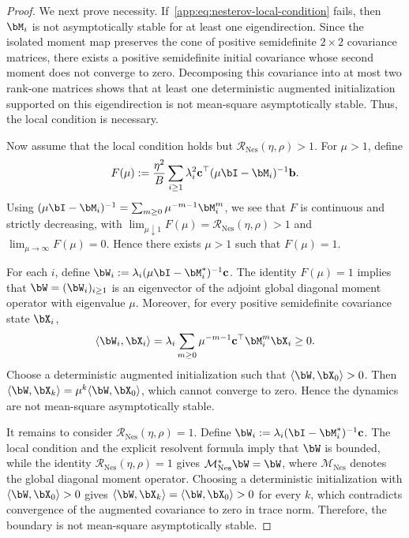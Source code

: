 \begin{proof}
We next prove necessity. If~\eqref{app:eq:nesterov-local-condition} fails, then \(\bM_i\) is not asymptotically stable for at least one eigendirection. Since the isolated moment map preserves the cone of positive semidefinite \(2\times2\) covariance matrices, there exists a positive semidefinite initial covariance whose second moment does not converge to zero. Decomposing this covariance into at most two rank-one matrices shows that at least one deterministic augmented initialization supported on this eigendirection is not mean-square asymptotically stable. Thus, the local condition is necessary.

Now assume that the local condition holds but \(\mathcal R_{\mathrm{Nes}}(\eta,\rho)>1\). For \(\mu>1\), define
\[
F(\mu):=\frac{\eta^2}{B}\sum_{i\geq1}\lambda_i^2\mathbf c^\top(\mu\bI-\bM_i)^{-1}\mathbf b.
\]
Using \((\mu\bI-\bM_i)^{-1}=\sum_{m\geq0}\mu^{-m-1}\bM_i^m\), we see that \(F\) is continuous and strictly decreasing, with \(\lim_{\mu\downarrow1}F(\mu)=\mathcal R_{\mathrm{Nes}}(\eta,\rho)>1\) and \(\lim_{\mu\to\infty}F(\mu)=0\). Hence there exists \(\mu>1\) such that \(F(\mu)=1\).

For each \(i\), define \(\bW_i:=\lambda_i(\mu\bI-\bM_i^*)^{-1}\mathbf c\). The identity \(F(\mu)=1\) implies that \(\bW=(\bW_i)_{i\geq1}\) is an eigenvector of the adjoint global diagonal moment operator with eigenvalue \(\mu\). Moreover, for every positive semidefinite covariance state \(\bX_i\),
\[
\langle\bW_i,\bX_i\rangle=\lambda_i\sum_{m\geq0}\mu^{-m-1}\mathbf c^\top\bM_i^m\bX_i\geq0.
\]
Choose a deterministic augmented initialization such that \(\langle\bW,\bX_0\rangle>0\). Then \(\langle\bW,\bX_k\rangle=\mu^k\langle\bW,\bX_0\rangle\), which cannot converge to zero. Hence the dynamics are not mean-square asymptotically stable.

It remains to consider \(\mathcal R_{\mathrm{Nes}}(\eta,\rho)=1\). Define \(\bW_i:=\lambda_i(\bI-\bM_i^*)^{-1}\mathbf c\). The local condition and the explicit resolvent formula imply that \(\bW\) is bounded, while the identity \(\mathcal R_{\mathrm{Nes}}(\eta,\rho)=1\) gives \(\mathcal M_{\mathrm{Nes}}^*\bW=\bW\), where \(\mathcal M_{\mathrm{Nes}}\) denotes the global diagonal moment operator. Choosing a deterministic initialization with \(\langle\bW,\bX_0\rangle>0\) gives \(\langle\bW,\bX_k\rangle=\langle\bW,\bX_0\rangle>0\) for every \(k\), which contradicts convergence of the augmented covariance to zero in trace norm. Therefore, the boundary is not mean-square asymptotically stable.
\end{proof}

